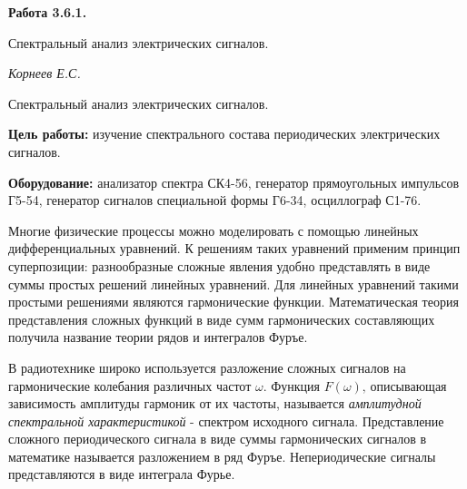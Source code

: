 \documentclass[14pt]{article}
\begin{document}
\begin{titlepage}
	\begin{center}
		\fontsize{18pt}{20pt}\selectfont
		\textbf{Работа 3.6.1.}	
	
		\vspace{5cm}
		\fontsize{24pt}{25pt}\selectfont
		Спектральный анализ электрических сигналов. 
	\end{center}
	\begin{flushright}
		\fontsize{18pt}{20pt}\selectfont
		\vspace{14cm}
		\hspace{-3cm}
		\textit{Корнеев Е.С.}
	\end{flushright}		
\end{titlepage}

\begin{center}
	\fontsize{16pt}{18pt}\selectfont	
	Спектральный анализ электрических сигналов. 
\end{center}


\fontsize{14pt}{16pt}\selectfont
\vspace{1cm}
\textbf{Цель работы:} изучение спектрального состава периодических электрических сигналов.

\vspace{0.5cm}
\textbf{Оборудование:} анализатор спектра СК4-56, генератор прямоугольных импульсов Г5-54, генератор сигналов специальной формы Г6-34, осциллограф С1-76.

\vspace{1cm}

Многие физические процессы можно моделировать с помощью линейных дифференциальных уравнений. К решениям таких уравнений применим принцип суперпозиции: разнообразные сложные явления удобно представлять в виде суммы простых решений линейных уравнений. Для линейных уравнений такими простыми решениями являются гармонические функции. Математическая теория представления сложных функций в виде сумм гармонических составляющих получила название теории рядов и интегралов Фуръе.

В радиотехнике широко используется разложение сложных сигналов на гармонические колебания различных частот $\omega$. Функция $F(\omega)$‚ описывающая зависимость амплитуды гармоник от их частоты, называется \textsl{амплитудной спектральной характеристикой} - спектром исходного сигнала. Представление сложного периодического сигнала в виде суммы гармонических сигналов в математике называется разложением в ряд Фуръе. Непериодические сигналы представляются в виде интеграла Фурье.
\end{document}
